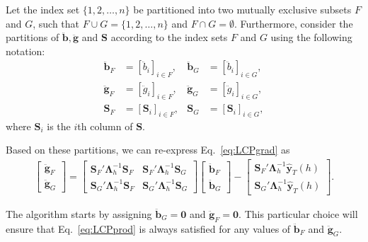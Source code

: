 \documentclass[11pt]{article}
\newcommand{\0}{\phantom{0}}
\begin{document}
Let the index set $\{1, 2, \dots, n\}$ be partitioned into two mutually exclusive subsets $F$ and $G$, such that $F \cup G = \{1, 2, \dots, n\}$ and $F \cap G = \emptyset$. Furthermore, consider the partitions of $\ddot{\bm{b}}, \ddot{\bm{g}}$ and $\bm{S}$ according to the index sets $F$ and $G$ using the following notation:
\begin{align*}
\ddot{\bm{b}}_{F} & = [\ddot{b}_{i}]_{i \in F}, & \ddot{\bm{b}}_{G} & = [\ddot{b}_{i}]_{i \in G},\\
\ddot{\bm{g}}_{F} & = [\ddot{g}_{i}]_{i \in F}, & \ddot{\bm{g}}_{G} & = [\ddot{g}_{i}]_{i \in G},\\
\bm{S}_{F} & = [\bm{S}_{i}]_{i \in F}, & \bm{S}_{G} & = [\bm{S}_{i}]_{i \in G},
\end{align*}
where $\bm{S}_{i}$ is the $i$th column of $\bm{S}$. 

Based on these partitions, we can re-express Eq.\ \eqref{eq:LCPgrad} as
\begin{align*}
\begin{bmatrix}
\ddot{\bm{g}}_{F}\\
\ddot{\bm{g}}_{G}
\end{bmatrix} = 
\begin{bmatrix}
\bm{S}_{F}'\bm{\Lambda}_{h}^{-1}\bm{S}_{F} & \bm{S}_{F}'\bm{\Lambda}_{h}^{-1}\bm{S}_{G}\\
\bm{S}_{G}'\bm{\Lambda}_{h}^{-1}\bm{S}_{F} & \bm{S}_{G}'\bm{\Lambda}_{h}^{-1}\bm{S}_{G}
\end{bmatrix}
\begin{bmatrix}
\ddot{\bm{b}}_{F}\\
\ddot{\bm{b}}_{G}
\end{bmatrix} - 
\begin{bmatrix}
\bm{S}_{F}'\bm{\Lambda}_{h}^{-1}\hat{\bm{y}}_{T}(h)\\
\bm{S}_{G}'\bm{\Lambda}_{h}^{-1}\hat{\bm{y}}_{T}(h)
\end{bmatrix}.
\end{align*}

The algorithm starts by assigning $\ddot{\bm{b}}_{G} = \bm{0}$ and $\ddot{\bm{g}}_{F} = \bm{0}$. This particular choice will ensure that Eq.\ \eqref{eq:LCPprod} is always satisfied for any values of $\ddot{\bm{b}}_{F}$ and $\ddot{\bm{g}}_{G}$. 
\end{document}
